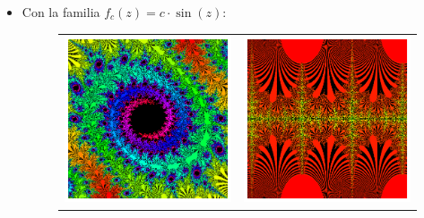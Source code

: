 \begin{itemize}
  \item Con la familia $f_c(z)=c\cdot \sin(z)$:
  
\begin{figure}[ht]
  \centering
  \begin{tabular}{cc}
    \includegraphics[scale=0.5]{./img/C3/juliaS-1.png} &   \includegraphics[scale=0.5]{./img/C3/juliaS-2.png}
  \end{tabular}
\end{figure}



\end{itemize}
